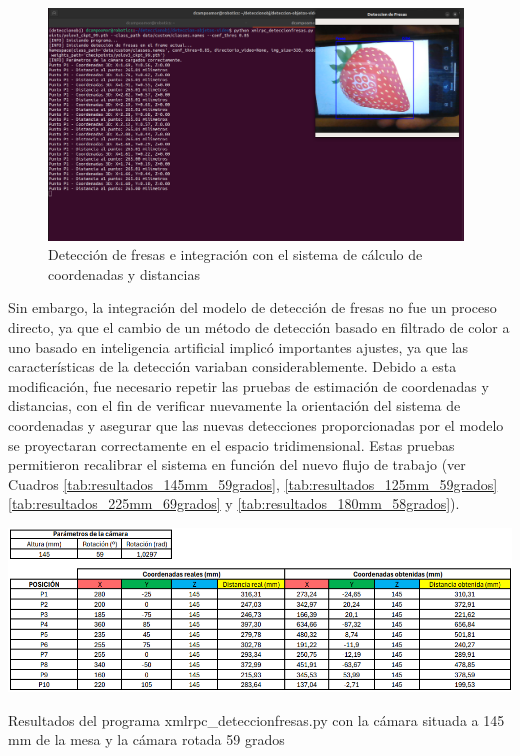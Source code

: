   \begin{figure}[H]
    \centering
    \begin{center}
      \includegraphics[width=110mm]{figs/Pruebas deteccion fresas y obtencion coordenadas varios codigos.png}
    \end{center}
    \caption{Detección de fresas e integración con el sistema de cálculo de coordenadas y distancias}
    \label{fig:union_scripts_fresas}
  \end{figure}

Sin embargo, la integración del modelo de detección de fresas no fue un proceso directo, ya que el cambio de un método de detección basado en filtrado de color a uno basado en inteligencia artificial implicó importantes ajustes, ya que las características de la detección variaban considerablemente. Debido a esta modificación, fue necesario repetir las pruebas de estimación de coordenadas y distancias, con el fin de verificar nuevamente la orientación del sistema de coordenadas y asegurar que las nuevas detecciones proporcionadas por el modelo se proyectaran correctamente en el espacio tridimensional. Estas pruebas permitieron recalibrar el sistema en función del nuevo flujo de trabajo (ver Cuadros \ref{tab:resultados_145mm_59grados}, \ref{tab:resultados_125mm_59grados} \ref{tab:resultados_225mm_69grados} y \ref{tab:resultados_180mm_58grados}).

   \begin{table}[H]
     \centering
     \begin{center}
       \includegraphics[width=155mm]{figs/Resultados 145 mm 59 grados.png}
     \end{center}
     \caption{Resultados del programa xmlrpc\_deteccionfresas.py con la cámara situada a 145 mm de la mesa y la cámara rotada 59 grados}
     \label{tab:resultados_145mm_59grados}
  \end{table}
  

